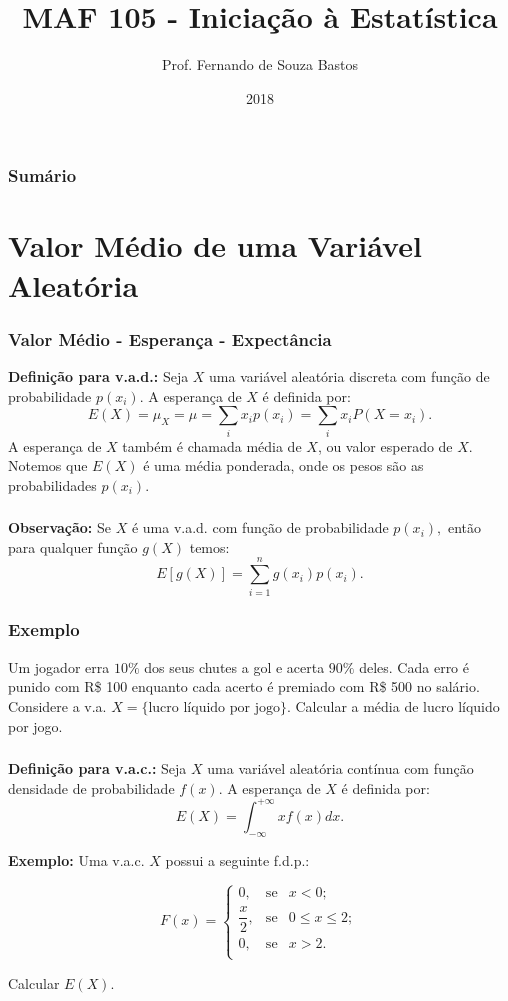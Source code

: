 \documentclass[14pt,aspectratio=1610]{beamer}
\title{MAF 105 - Iniciação à Estatística}
\author{Prof. Fernando de Souza Bastos}
\institute{Instituto de Ciências Exatas e Tecnológicas\texorpdfstring{\\ Universidade Federal de Viçosa}{}\texorpdfstring{\\ Campus UFV - Florestal}{}}
\date{2018}
\begin{document}


\frame{\titlepage}

\begin{frame}{}
\frametitle{\bf Sumário}
\tableofcontents
\end{frame}

\section{Valor Médio de uma Variável Aleatória}
\begin{frame}{}
\frametitle{Valor Médio - Esperança - Expectância}
\begin{block}{}
\justifying
\textbf{Definição para v.a.d.:} Seja $X$ uma variável aleatória discreta com função de probabilidade $p(x_{i})$. A esperança de $X$ é definida por: 
$$\displaystyle E(X)=\mu_{X}=\mu=\sum_{i}x_{i}p(x_{i})=\sum_{i}x_{i}P(X=x_{i}).$$ A esperança de $X$ também é chamada média de $X$, ou valor esperado de $X$. 
Notemos que $E(X)$ é uma média ponderada, onde os pesos são as probabilidades $p(x_{i}).$
\end{block}
\end{frame}

\begin{frame}{}
\frametitle{}
\begin{block}{}
\justifying
\textbf{Observação:} Se $X$ é uma v.a.d. com função de probabilidade $p(x_{i}),$ então para qualquer função $g(X)$ temos: 
$$\displaystyle E[g(X)]=\sum_{i=1}^{n}g(x_{i})p(x_{i}).$$
\end{block}
\end{frame}

\begin{frame}{}
\frametitle{Exemplo}
\begin{block}{}
\justifying
Um jogador erra $10\%$ dos seus chutes a gol e acerta $90\%$ deles. Cada erro é punido com R\$ 100 enquanto cada acerto é premiado com R\$ 500 no salário. 
Considere a v.a. $X=\{\textrm{lucro líquido por jogo}\}.$ Calcular a média de lucro líquido por jogo.
\end{block}
\end{frame}

\begin{frame}{}
\frametitle{}
\begin{block}{}
\justifying
\textbf{Definição para v.a.c.:} Seja $X$ uma variável aleatória contínua com função densidade de probabilidade $f(x)$. A esperança de $X$ é definida por: 
$$\displaystyle E(X)=\int_{-\infty}^{+\infty}xf(x)dx.$$

\textbf{Exemplo:} Uma v.a.c. $X$ possui a seguinte f.d.p.:

$$
F(x)=\left\{
\begin{array}{ccccc}
0,           & \textrm{se} & x<0     ;\\
\dfrac{x}{2},& \textrm{se} & 0\leq x\leq 2;\\
0,           & \textrm{se} & x> 2 .\\
\end{array}
\right.
$$

Calcular $E(X).$

\end{block}
\end{frame}
\end{document}
